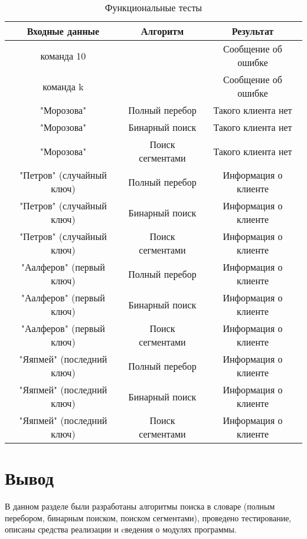 \documentclass[a4paper,14pt, unknownkeysallowed]{extreport}
\begin{document}
\begin{center}
\captionsetup{justification=raggedright,singlelinecheck=off}
\begin{longtable}[c]{|c|c|c|}
\caption{Функциональные тесты\label{tbl:functional_test}}
	\\ \hline
	Входные данные & Алгоритм & Результат 
	\\ \hline
	команда 10 &  & Сообщение об ошибке
	\\ \hline
	команда k &  & Сообщение об ошибке
	\\ \hline
	"Морозова" & Полный перебор & Такого клиента нет
	\\ \hline
	"Морозова" & Бинарный поиск & Такого клиента нет
	\\ \hline
	"Морозова" & Поиск сегментами & Такого клиента нет
	\\ \hline
	"Петров" (случайный ключ) & Полный перебор & Информация о клиенте
	\\ \hline
	"Петров" (случайный ключ) & Бинарный поиск & Информация о клиенте
	\\ \hline
	"Петров" (случайный ключ) & Поиск сегментами & Информация о клиенте
	\\ \hline
	"Аалферов" (первый ключ) & Полный перебор & Информация о клиенте
	\\ \hline
	"Аалферов" (первый ключ) & Бинарный поиск & Информация о клиенте
	\\ \hline
	"Аалферов" (первый ключ) & Поиск сегментами & Информация о клиенте
	\\ \hline
	"Яяпмей" (последний ключ) & Полный перебор & Информация о клиенте
	\\ \hline
	"Яяпмей" (последний ключ) & Бинарный поиск & Информация о клиенте
	\\ \hline
	"Яяпмей" (последний ключ) & Поиск сегментами & Информация о клиенте
	\\ \hline
\end{longtable}
\end{center}

\section{Вывод}

В данном разделе были разработаны алгоритмы поиска в словаре (полным перебором, бинарным поиском, поиском сегментами), проведено тестирование, описаны средства реализации и cведения о модулях программы.
\end{document}
